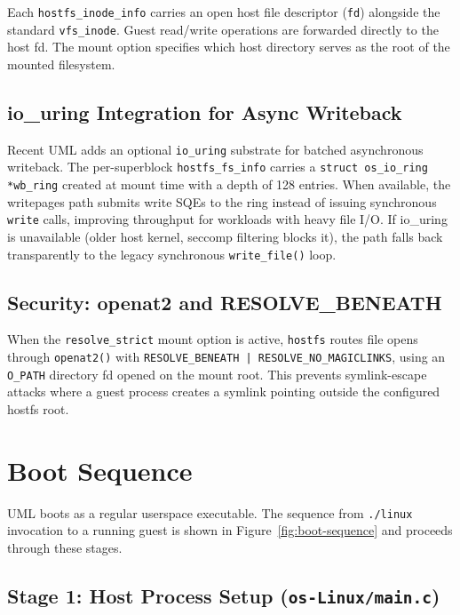 Each \texttt{hostfs\_inode\_info} carries an open host file descriptor
(\texttt{fd}) alongside the standard \texttt{vfs\_inode}.  Guest read/write
operations are forwarded directly to the host fd.  The mount option specifies
which host directory serves as the root of the mounted filesystem.

\subsection{io\_uring Integration for Async Writeback}

Recent UML adds an optional \texttt{io\_uring} substrate for batched
asynchronous writeback.  The per-superblock \texttt{hostfs\_fs\_info} carries
a \texttt{struct os\_io\_ring *wb\_ring} created at mount time with a depth of
128 entries.  When available, the writepages path submits write SQEs to the
ring instead of issuing synchronous \texttt{write} calls, improving throughput
for workloads with heavy file I/O.  If io\_uring is unavailable (older host
kernel, seccomp filtering blocks it), the path falls back transparently to
the legacy synchronous \texttt{write\_file()} loop.

\subsection{Security: openat2 and RESOLVE\_BENEATH}

When the \texttt{resolve\_strict} mount option is active, \texttt{hostfs}
routes file opens through \texttt{openat2()} with
\texttt{RESOLVE\_BENEATH | RESOLVE\_NO\_MAGICLINKS}, using an \texttt{O\_PATH}
directory fd opened on the mount root.  This prevents symlink-escape attacks
where a guest process creates a symlink pointing outside the configured
hostfs root.

\section{Boot Sequence}
\label{sec:impl-boot}

UML boots as a regular userspace executable.  The sequence from
\texttt{./linux} invocation to a running guest is shown in
Figure~\ref{fig:boot-sequence} and proceeds through these stages.

\subsection{Stage 1: Host Process Setup (\texttt{os-Linux/main.c})}
\label{sec:impl-boot-stage1}

